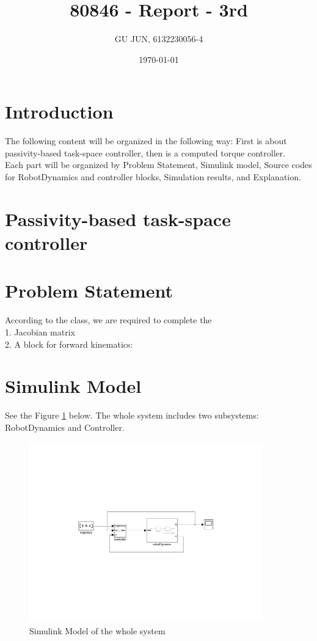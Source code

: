 \documentclass{article}
\title{80846 - Report - 3rd}
\author{GU JUN, 6132230056-4}
\date{\today}
\begin{document}
\maketitle

\section*{Introduction}

The following content will be organized in the following way: First is about passivity-based task-space controller, then is a computed torque controller. 
\\
Each part will be organized by Problem Statement, Simulink model, Source codes for RobotDynamics and controller blocks, Simulation results, and Explanation.

\section*{\centering \Huge Passivity-based task-space controller}

\section*{Problem Statement}

According to the class, we are required to complete the \\
1. Jacobian matrix \\
2. A block for forward kinematics: \\


\section{Simulink Model}
See the Figure \ref{fig:model_task_model} below. The whole system includes two subsystems: RobotDynamics and Controller.
\begin{figure}[ht]
    \centering
    \includegraphics[width=0.9\textwidth]{figures/model_task_space.pdf}
    \caption{Simulink Model of the whole system}
    \label{fig:model_task_model}
\end{figure}
\end{document}
